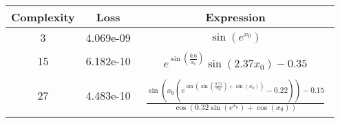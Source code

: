 \begin{center}
        \begin{tabular}{|c|c|c|}
        \hline
        Complexity & Loss & Expression \\
        \hline
        3 & 4.069e-09 & $\begin{aligned}\sin{\left(e^{x_{0}} \right)}\end{aligned}$\\ \hline15 & 6.182e-10 & $\begin{aligned}e^{\sin{\left(\frac{0.6}{x_{0}} \right)}} \sin{\left(2.37 x_{0} \right)} - 0.35\end{aligned}$\\ \hline27 & 4.483e-10 & $\begin{aligned}\frac{\sin{\left(x_{0} \left(e^{\sin{\left(\sin{\left(\frac{0.71}{x_{0}} \right)} + \sin{\left(x_{0} \right)} \right)}} - 0.22\right) \right)} - 0.15}{\cos{\left(0.32 \sin{\left(e^{x_{0}} \right)} + \cos{\left(x_{0} \right)} \right)}}\end{aligned}$\\ \hline\end{tabular}
        \end{center}
        